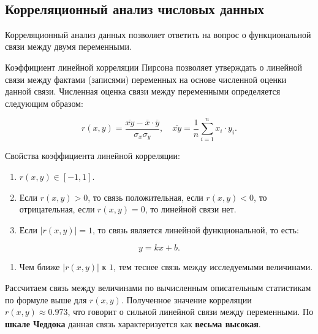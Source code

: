 \documentclass[
]{article}
\providecommand{\tightlist}{%
  \setlength{\itemsep}{0pt}\setlength{\parskip}{0pt}}
\begin{document}
\(\ \)

\hypertarget{ux43aux43eux440ux440ux435ux43bux44fux446ux438ux43eux43dux43dux44bux439-ux430ux43dux430ux43bux438ux437-ux447ux438ux441ux43bux43eux432ux44bux445-ux434ux430ux43dux43dux44bux445}{%
\subsection{\texorpdfstring{\textbf{Корреляционный анализ числовых
данных}}{Корреляционный анализ числовых данных}}\label{ux43aux43eux440ux440ux435ux43bux44fux446ux438ux43eux43dux43dux44bux439-ux430ux43dux430ux43bux438ux437-ux447ux438ux441ux43bux43eux432ux44bux445-ux434ux430ux43dux43dux44bux445}}

Корреляционный анализ данных позволяет ответить на вопрос о
функциональной связи между двумя переменными.

Коэффициент линейной корреляции Пирсона позволяет утверждать о линейной
связи между фактами (записями) переменных на основе численной оценки
данной связи. Численная оценка связи между переменными определяется
следующим образом:

\[
r(x,  y) = \frac{\overline{xy} - \overline{x} \cdot \overline{y}}{\sigma_x \sigma_y}, \quad \overline{xy} = \frac{1}{n} \sum \limits_{i=1}^{n} x_i \cdot y_i.
\]

Свойства коэффициента линейной корреляции:

\begin{enumerate}
\def\labelenumi{\arabic{enumi}.}
\item
  \(r(x, y) \in [-1, 1].\)
\item
  Если \(r(x, y) > 0\), то связь положительная, если \(r(x,y) < 0\), то
  отрицательная, если \(r(x,y) = 0\), то линейной связи нет.
\item
  Если \(|r(x,y)| = 1\), то связь является линейной функциональной, то
  есть:
\end{enumerate}

\[y = kx + b.\]

\begin{enumerate}
\def\labelenumi{\arabic{enumi}.}
\setcounter{enumi}{3}
\tightlist
\item
  Чем ближе \(|r(x,y)|\) к \(1\), тем теснее связь между исследуемыми
  величинами.
\end{enumerate}

Рассчитаем связь между величинами по вычисленным описательным
статистикам по формуле выше для \(r(x, y)\). Полученное значение
корреляции \(r(x, y) \approx 0.973\), что говорит о сильной линейной
связи между переменными. По \textbf{шкале Чеддока} данная связь
характеризуется как \textbf{весьма высокая}.
\end{document}
